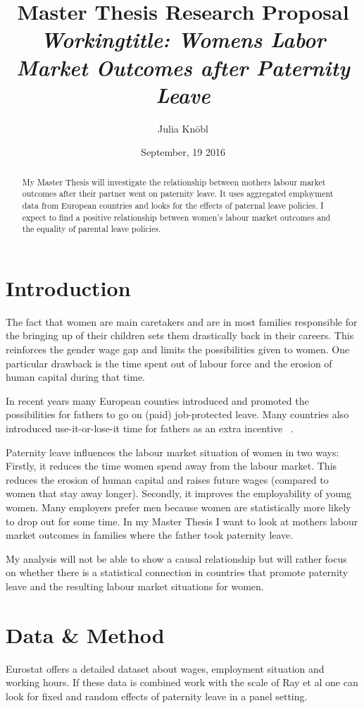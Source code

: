 \documentclass[notitlepage]{report}
\author{Julia Knöbl}
\date{September, 19 2016}
\title{Master Thesis Research Proposal \newline \textit{Workingtitle: Womens Labor Market Outcomes after Paternity Leave}}
\begin{document}
\thispagestyle{empty}
\maketitle
\begin{abstract}
My Master Thesis will investigate the relationship between mothers labour market outcomes after their partner went on paternity leave. It uses aggregated employment data from European countries and looks for the effects of paternal leave policies. I expect to find a positive relationship between women's labour market outcomes and the equality of parental leave policies. 
\end{abstract}
\section*{Introduction}
\par The fact that women are main caretakers  and are in most families responsible for the bringing up of their children sets them drastically back in their careers. This reinforces the gender wage gap and limits the possibilities given to women. One particular drawback is the time spent out of labour force and the erosion of human capital during that time. 
\par In recent years many European counties introduced and promoted the possibilities for fathers to go on (paid) job-protected leave. Many countries also introduced use-it-or-lose-it time for fathers as an extra incentive ~\cite{ray2010cares}.
\par Paternity leave influences the labour market situation of women in two ways: Firstly, it reduces the time women spend away from the labour market. This reduces the erosion of human capital and raises future wages (compared to women that stay away longer). Secondly, it improves the employability of young women. Many employers prefer men because women are statistically more likely to drop out for some time.  In my Master Thesis I want to look at mothers labour market outcomes in families where the father took paternity leave.
\par My analysis will not be able to show a causal relationship but will rather focus on whether there is a statistical connection in countries that promote paternity leave and the resulting labour market situations for women.
 
\section*{Data \& Method}
\par Eurostat offers a detailed dataset about wages, employment situation and working hours. If these data is combined work with the scale of Ray et al \citeyear{ray2010cares} one can look for fixed and random effects of paternity leave in a panel setting.
\end{document}
